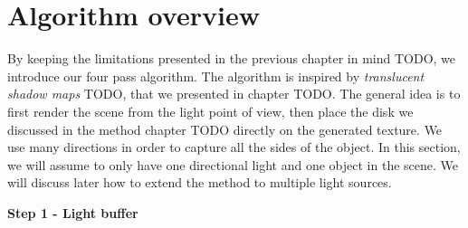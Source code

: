 %
%
%
%

\section{Algorithm overview}

By keeping the limitations presented in the previous chapter in mind TODO, we introduce our four pass algorithm. The algorithm is inspired by \emph{translucent shadow maps} TODO, that we presented in chapter TODO. The general idea is to first render the scene from the light point of view, then place the disk we discussed in the method chapter TODO directly on the generated texture. We use many directions in order to capture all the sides of the object. In this section, we will assume to only have one directional light and one object in the scene. We will discuss later how to extend the method to multiple light sources.

\textbf{Step 1 - Light buffer} \\

